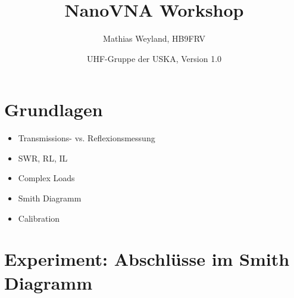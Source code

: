 \documentclass[twoside,a4paper,11pt,halfparskip,DIV=11,notitlepage]{scrartcl}
\author{Mathias Weyland, HB9FRV}
\title{NanoVNA Workshop}
\date{UHF-Gruppe der USKA, Version 1.0}
\newcounter{uebungscounter}
\newcommand{\uebung}[1]{
    \stepcounter{uebungscounter}
    \section{Übung \arabic{uebungscounter}: #1}
    \renewcommand{\labelenumi}{\arabic{uebungscounter}.\arabic{enumi}}
}
\begin{document}
\maketitle
\thispagestyle{empty}

\tableofcontents

\vfill


\vfill

\newpage



\section{Grundlagen}

\begin{itemize}
    \item Transmissions- vs. Reflexionsmessung
    \item SWR, RL, IL
    \item Complex Loads
    \item Smith Diagramm
    \item Calibration
\end{itemize}

\section{Experiment: Abschlüsse im Smith Diagramm}
\end{document}
